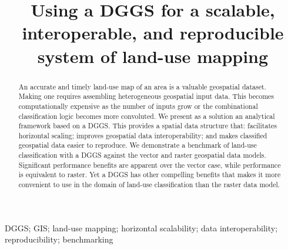 \documentclass[]{interact}
\theoremstyle{plain}%
\theoremstyle{definition}
\theoremstyle{remark}
\begin{document}

\title{Using a \acl{DGGS} for a scalable, interoperable, and reproducible system of land-use mapping}

\author{
    }

\maketitle

\begin{abstract}
An accurate and timely land-use map of an area is a valuable geospatial dataset. Making one requires assembling heterogeneous geospatial input data. This becomes computationally expensive as the number of inputs grow or the combinational classification logic becomes more convoluted. We present as a solution an analytical framework based on a \ac{DGGS}. This provides a spatial data structure that: facilitates horizontal scaling; improves geospatial data interoperability; and makes classified geospatial data easier to reproduce. We demonstrate a benchmark of land-use classification with a \ac{DGGS} against the vector and raster geospatial data models. Significant performance benefits are apparent over the vector case, while performance is equivalent to raster. Yet a \ac{DGGS} has other compelling benefits that makes it more convenient to use in the domain of land-use classification than the raster data model.
\end{abstract}



\begin{keywords}
\Acl{DGGS}; \acl{GIS}; land-use mapping; horizontal scalability; data interoperability; reproducibility; benchmarking
\end{keywords}
\end{document}
